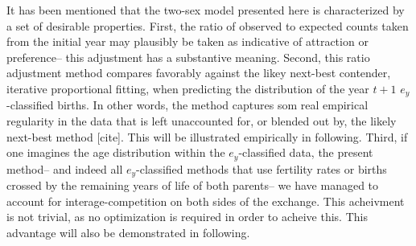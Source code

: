 
It has been mentioned that the two-sex model presented here is characterized by
a set of desirable properties. First, the ratio of observed to expected counts
taken from the initial year may plausibly be taken as indicative of
attraction or preference-- this adjustment has a substantive meaning.
Second, this ratio adjustment method compares favorably against the likey
next-best contender, iterative proportional fitting, when predicting the
distribution of the year $t+1$ $e_y$-classified births. In other words, the
method captures som real empirical regularity in the data that is left
unaccounted for, or blended out by, the likely next-best method [cite]. This
will be illustrated empirically in following. Third, if one imagines the age
distribution within the $e_y$-classified data, the present method-- and indeed
all $e_y$-classified methods that use fertility rates or births crossed by the
remaining years of life of both parents-- we have managed to account for
interage-competition on both sides of the exchange. This acheivment is not
trivial, as no optimization is required in order to acheive this. This advantage
will also be demonstrated in following.









